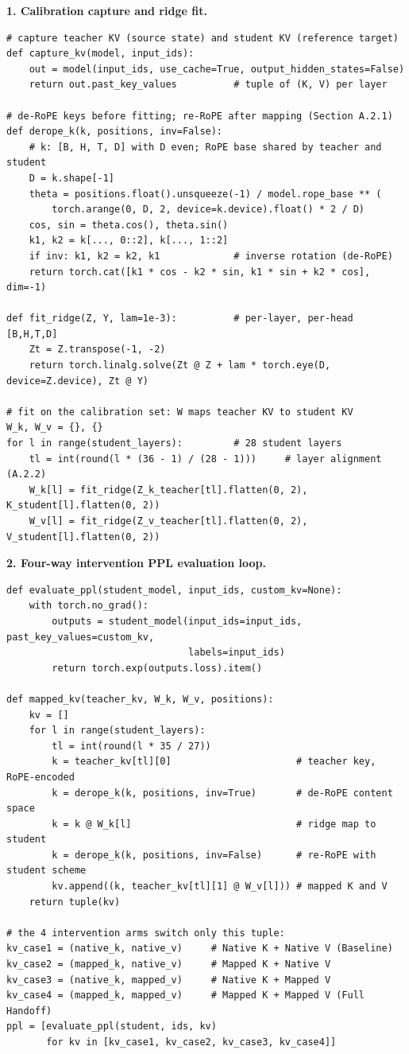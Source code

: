 \documentclass[10pt]{article}
\begin{document}
\textbf{1. Calibration capture and ridge fit.}
\begin{small}
\begin{verbatim}
# capture teacher KV (source state) and student KV (reference target)
def capture_kv(model, input_ids):
    out = model(input_ids, use_cache=True, output_hidden_states=False)
    return out.past_key_values          # tuple of (K, V) per layer

# de-RoPE keys before fitting; re-RoPE after mapping (Section A.2.1)
def derope_k(k, positions, inv=False):
    # k: [B, H, T, D] with D even; RoPE base shared by teacher and student
    D = k.shape[-1]
    theta = positions.float().unsqueeze(-1) / model.rope_base ** (
        torch.arange(0, D, 2, device=k.device).float() * 2 / D)
    cos, sin = theta.cos(), theta.sin()
    k1, k2 = k[..., 0::2], k[..., 1::2]
    if inv: k1, k2 = k2, k1             # inverse rotation (de-RoPE)
    return torch.cat([k1 * cos - k2 * sin, k1 * sin + k2 * cos], dim=-1)

def fit_ridge(Z, Y, lam=1e-3):          # per-layer, per-head [B,H,T,D]
    Zt = Z.transpose(-1, -2)
    return torch.linalg.solve(Zt @ Z + lam * torch.eye(D, device=Z.device), Zt @ Y)

# fit on the calibration set: W maps teacher KV to student KV
W_k, W_v = {}, {}
for l in range(student_layers):         # 28 student layers
    tl = int(round(l * (36 - 1) / (28 - 1)))     # layer alignment (A.2.2)
    W_k[l] = fit_ridge(Z_k_teacher[tl].flatten(0, 2), K_student[l].flatten(0, 2))
    W_v[l] = fit_ridge(Z_v_teacher[tl].flatten(0, 2), V_student[l].flatten(0, 2))
\end{verbatim}
\end{small}

\textbf{2. Four-way intervention PPL evaluation loop.}
\begin{small}
\begin{verbatim}
def evaluate_ppl(student_model, input_ids, custom_kv=None):
    with torch.no_grad():
        outputs = student_model(input_ids=input_ids, past_key_values=custom_kv,
                                labels=input_ids)
        return torch.exp(outputs.loss).item()

def mapped_kv(teacher_kv, W_k, W_v, positions):
    kv = []
    for l in range(student_layers):
        tl = int(round(l * 35 / 27))
        k = teacher_kv[tl][0]                      # teacher key, RoPE-encoded
        k = derope_k(k, positions, inv=True)       # de-RoPE content space
        k = k @ W_k[l]                             # ridge map to student
        k = derope_k(k, positions, inv=False)      # re-RoPE with student scheme
        kv.append((k, teacher_kv[tl][1] @ W_v[l])) # mapped K and V
    return tuple(kv)

# the 4 intervention arms switch only this tuple:
kv_case1 = (native_k, native_v)     # Native K + Native V (Baseline)
kv_case2 = (mapped_k, native_v)     # Mapped K + Native V
kv_case3 = (native_k, mapped_v)     # Native K + Mapped V
kv_case4 = (mapped_k, mapped_v)     # Mapped K + Mapped V (Full Handoff)
ppl = [evaluate_ppl(student, ids, kv)
       for kv in [kv_case1, kv_case2, kv_case3, kv_case4]]
\end{verbatim}
\end{small}
\end{document}
